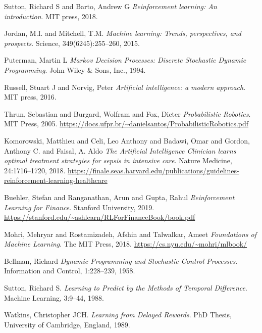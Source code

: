 \begin{thebibliography}{99}


Sutton, Richard S and Barto, Andrew G \textit{Reinforcement learning: An introduction}. MIT press, 2018.

Jordan, M.I. and Mitchell, T.M. \textit{Machine learning: Trends, perspectives, and prospects}. Science, 349(6245):255--260, 2015.

Puterman, Martin L \textit{Markov Decision Processes: Discrete Stochastic Dynamic Programming}. John Wiley \& Sons, Inc., 1994.

Russell, Stuart J and Norvig, Peter \textit{Artificial intelligence: a modern approach}. MIT press, 2016.


Thrun, Sebastian and Burgard, Wolfram and Fox, Dieter \textit{Probabilistic Robotics}. MIT Press, 2005. \url{https://docs.ufpr.br/~danielsantos/ProbabilisticRobotics.pdf}


Komorowski, Matthieu and Celi, Leo Anthony and Badawi, Omar and Gordon, Anthony C. and Faisal, A. Aldo \textit{The Artificial Intelligence Clinician learns optimal treatment strategies for sepsis in intensive care}. Nature Medicine, 24:1716–1720, 2018. \url{https://finale.seas.harvard.edu/publications/guidelines-reinforcement-learning-healthcare}



Buehler, Stefan and Ranganathan, Arun and Gupta, Rahul \textit{Reinforcement Learning for Finance}. Stanford University, 2019. \url{https://stanford.edu/~ashlearn/RLForFinanceBook/book.pdf}


Mohri, Mehryar and Rostamizadeh, Afshin and Talwalkar, Ameet \textit{Foundations of Machine Learning}. The MIT Press, 2018. \url{https://cs.nyu.edu/~mohri/mlbook/}


Bellman, Richard \textit{Dynamic Programming and Stochastic Control Processes}. Information and Control, 1:228--239, 1958.

Sutton, Richard S. \textit{Learning to Predict by the Methods of Temporal Difference}. Machine Learning, 3:9--44, 1988.

Watkins, Christopher JCH. \textit{Learning from Delayed Rewards}. PhD Thesis, University of Cambridge, England, 1989.






\end{thebibliography}
